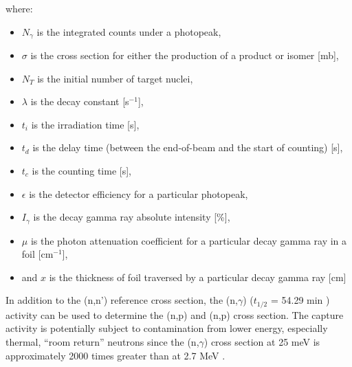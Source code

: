 where:

\begin{itemize}
  

\item $N_{\gamma}$ is the integrated counts under a photopeak,


\item $\sigma$ is the cross section for either the production of a product or isomer [mb],

\item $N_T$ is the initial number of target nuclei,

\item $\lambda$  is the decay constant [s$^{-1}$],

\item $t_i$ is the irradiation time [s],

\item $t_d$ is the delay time (between the end-of-beam and the start of counting) [s],

\item $t_c$ is the counting time   [s],

\item $\epsilon$ is the  detector efficiency for a particular photopeak,

\item $I_\gamma$ is the decay gamma ray absolute intensity [\%],

\item $\mu$ is the photon attenuation coefficient for a particular decay gamma ray in a foil [cm$^{-1}$],

\item and $x$ is the thickness of foil traversed by a particular decay gamma ray [cm] 
\end{itemize}

In addition to the (n,n') reference cross section, the (n,$\gamma$)  ($t_{1/2}$ = 54.29 min \cite{Blachot2010}) activity can be used to determine the  (n,p) and (n,p) cross section.
 The capture activity is potentially subject to contamination from lower energy, especially thermal, \enquote{room return} neutrons since the (n,$\gamma$) cross section at 25 meV is approximately 2000 times greater than at 2.7 MeV  \cite{Capote2012,zsolnay2012technical}.
   




